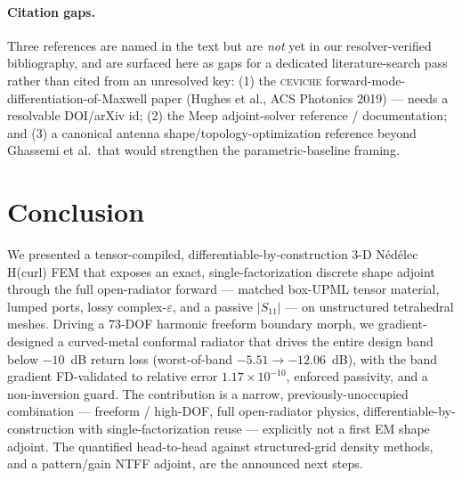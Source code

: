 \documentclass{anvil-paper}
\begin{document}
\paragraph{Citation gaps.}
Three references are named in the text but are \emph{not} yet in our
resolver-verified bibliography, and are surfaced here as gaps for a dedicated
literature-search pass rather than cited from an unresolved key: (1) the
\textsc{ceviche} forward-mode-differentiation-of-Maxwell paper (Hughes et al.,
ACS Photonics 2019) --- needs a resolvable DOI/arXiv id; (2) the Meep
adjoint-solver reference / documentation; and (3) a canonical antenna
shape/topology-optimization reference beyond Ghassemi et al.\ that would
strengthen the parametric-baseline framing.

\section{Conclusion}
\label{sec:conclusion}

We presented a tensor-compiled, differentiable-by-construction 3-D N\'ed\'elec
H(curl) FEM that exposes an exact, single-factorization discrete shape adjoint
through the full open-radiator forward --- matched box-UPML tensor material,
lumped ports, lossy complex-$\varepsilon$, and a passive $|S_{11}|$ --- on
unstructured tetrahedral meshes. Driving a 73-DOF harmonic freeform boundary
morph, we gradient-designed a curved-metal conformal radiator that drives the
entire design band below $-10$~dB return loss (worst-of-band $-5.51 \to
-12.06$~dB), with the band gradient FD-validated to relative error
$1.17\times10^{-10}$, enforced passivity, and a non-inversion guard. The
contribution is a narrow, previously-unoccupied combination --- freeform /
high-DOF, full open-radiator physics, differentiable-by-construction with
single-factorization reuse --- explicitly not a first EM shape adjoint. The
quantified head-to-head against structured-grid density methods, and a
pattern/gain NTFF adjoint, are the announced next steps.



\end{document}
